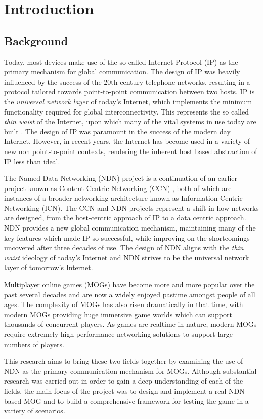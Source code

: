 \chapter{Introduction}
\section{Background}
Today, most devices make use of the so called Internet Protocol (IP) as the primary mechanism for global communication. The design of IP was heavily influenced by the success of the 20th century telephone networks, resulting in a protocol tailored towards point-to-point communication between two hosts. IP is the \textit{universal network layer} of today's Internet, which implements the minimum functionality required for global interconnectivity. This represents the so called \textit{thin waist} of the Internet, upon which many of the vital systems in use today are built \cite{ndn-exec-summary}. The design of IP was paramount in the success of the modern day Internet. However, in recent years, the Internet has become used in a variety of new non point-to-point contexts, rendering the inherent host based abstraction of IP less than ideal.  

The Named Data Networking (NDN) project is a continuation of an earlier project known as Content-Centric Networking (CCN) \cite{vj-named-content}, both of which are instances of a broader networking architecture known as Information Centric Networking (ICN). The CCN and NDN projects represent a shift in how networks are designed, from the host-centric approach of IP to a data centric approach. NDN provides a new global communication mechanism, maintaining many of the key features which made IP so successful, while improving on the shortcomings uncovered after three decades of use. The design of NDN aligns with the \textit{thin waist} ideology of today's Internet and NDN strives to be the universal network layer of tomorrow's Internet. 

Multiplayer online games (MOGs) have become more and more popular over the past several decades and are now a widely enjoyed pastime amongst people of all ages. The complexity of MOGs has also risen dramatically in that time, with modern MOGs providing huge immersive game worlds which can support thousands of concurrent players. As games are realtime in nature, modern MOGs require extremely high performance networking solutions to support large numbers of players.


This research aims to bring these two fields together by examining the use of NDN as the primary communication mechanism for MOGs. Although substantial research was carried out in order to gain a deep understanding of each of the fields, the main focus of the project was to design and implement a real NDN based MOG and to build a comprehensive framework for testing the game in a variety of scenarios.    

